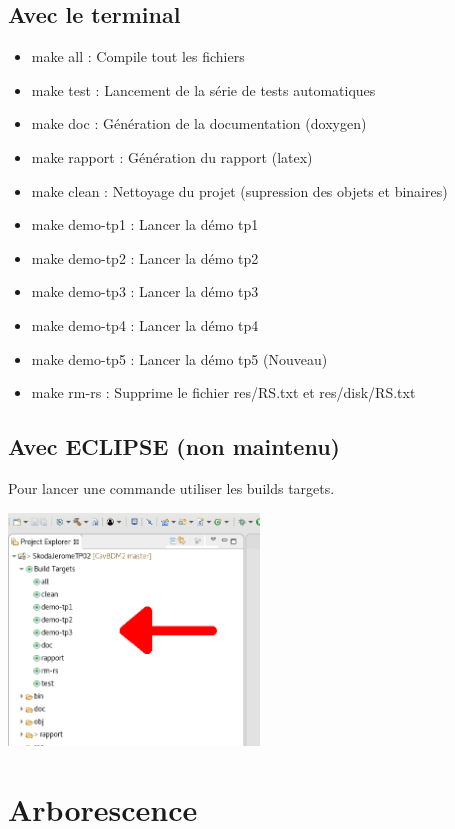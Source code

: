 \documentclass[a4paper]{article}
\begin{document}
\subsection{Avec le terminal}

\begin{itemize}
	\item make all : Compile tout les fichiers
	\item make test : Lancement de la série de tests automatiques
	\item make doc  : Génération de la documentation (doxygen)
	\item make rapport : Génération du rapport (latex)
	\item make clean : Nettoyage du projet (supression des objets et binaires)
	\item make demo-tp1 : Lancer la démo tp1
	\item make demo-tp2 : Lancer la démo tp2
	\item make demo-tp3 : Lancer la démo tp3
	\item make demo-tp4 : Lancer la démo tp4 
	\item make demo-tp5 : Lancer la démo tp5 (Nouveau)
	\item make rm-rs : Supprime le fichier res/RS.txt et res/disk/RS.txt
\end{itemize}

\subsection{Avec ECLIPSE (non maintenu) }

Pour lancer une commande utiliser les builds targets.

\includegraphics[width=0.5\textwidth]{builds-target.png}

\section{Arborescence}
\end{document}
